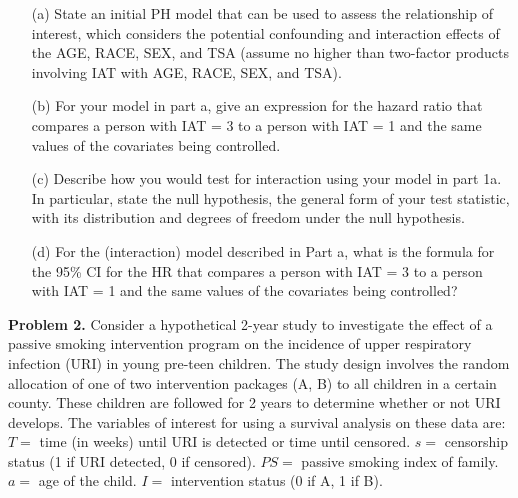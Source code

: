 \documentclass[12pt]{article}
\begin{document}
\begin{itemize}
	\item[(a)] State an initial PH model that can be used to assess the relationship of interest, which considers the potential confounding and interaction effects of the AGE, RACE, SEX, and TSA (assume no higher than two-factor  products  involving  IAT with  AGE, RACE, SEX, and TSA).

	\item[(b)] For your model in part a, give an expression for the hazard ratio that compares a person with IAT = 3 to a person with IAT = 1 and the same values of the covariates being controlled.
	
	\item[(c)] Describe how you would test for interaction using your model in part 1a. In particular, state the null hypothesis, the general form of your test statistic, with its distribution and degrees of freedom under the null hypothesis.

	\item[(d)] For the (interaction) model described in Part a, what is the formula for the 95\% CI for the HR that compares a person with IAT = 3 to a person with IAT = 1 and the same values of the covariates being controlled?
\end{itemize}



\textbf{Problem 2.}
Consider a hypothetical 2-year study to investigate the effect of a passive smoking intervention program on the incidence of upper respiratory infection (URI) in young pre-teen children. The study design involves the random allocation of one of two intervention packages (A, B) to all children in a certain county. These children are followed for 2 years to determine whether or not URI develops. The variables of interest for using a survival analysis on these data are: \\

$T =$ time (in weeks) until URI is detected or time until censored. $s =$ censorship status (1 if URI detected, 0 if censored). $PS =$ passive smoking index of family. $a =$ age of the child. $I =$ intervention status (0 if A, 1 if B).
\end{document}
